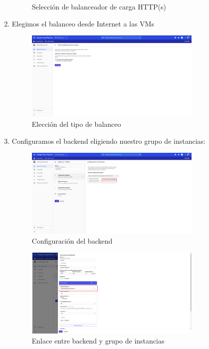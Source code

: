 \documentclass[12pt,spanish]{article}
\begin{document}
\begin{enumerate}
\begin{figure}[H]
		\caption{Selección de balanceador de carga HTTP(s)}
	\end{figure}
	\item Elegimos el balanceo desde Internet a las VMs
	\begin{figure}[H]
		\centering
		\includegraphics[width=0.8\textwidth]{project/frominternet.png}
		\caption{Elección del tipo de balanceo}
	\end{figure}
	\newpage
	\item Configuramos el backend eligiendo nuestro grupo de instancias:
	\begin{figure}[H]
		\centering
		\includegraphics[width=0.8\textwidth]{project/backend.png}
		\caption{Configuración del backend}
	\end{figure}
	\begin{figure}[H]
		\centering
		\includegraphics[width=0.8\textwidth]{project/backend_selection.png}
		\caption{Enlace entre backend y grupo de instancias}
	\end{figure}

\end{enumerate}
\end{document}
